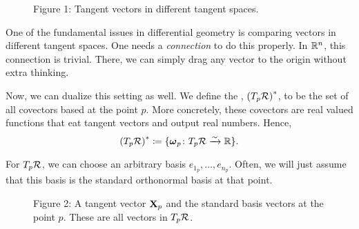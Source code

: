         \begin{figure}[ht]
        \centering
        \caption{Figure 1: Tangent vectors in different tangent spaces.}
        \end{figure}
        
\begin{remark}
One of the fundamental issues in differential geometry is comparing vectors in different tangent spaces.  One needs a \emph{connection} to do this properly.  In $\mathbb{R}^n$, this connection is trivial.  There, we can simply drag any vector to the origin without extra thinking.
\end{remark}

Now, we can dualize this setting as well.  We define the , $\left(T_p\mathcal{R}\right)^*$, to be the set of all covectors based at the point $p$.  More concretely, these covectors are real valued functions that eat tangent vectors and output real numbers. Hence,
\[
\left(T_p\mathcal{R}\right)^* \coloneqq \{\boldsymbol{\omega}_p \colon T_p\mathcal{R} \xrightarrow{\sim} \mathbb{R}\}.
\]

For $T_p\mathcal{R}$, we can choose an arbitrary basis $e_{1_p},\dots, e_{n_p}$. Often, we will just assume that this basis is the standard orthonormal basis at that point.


\begin{figure}[ht]
\centering
    \caption{Figure 2: A tangent vector $\mathbf{X}_p$ and the standard basis vectors at the point $p$. These are all vectors in $T_p\mathcal{R}$.}
\end{figure}


